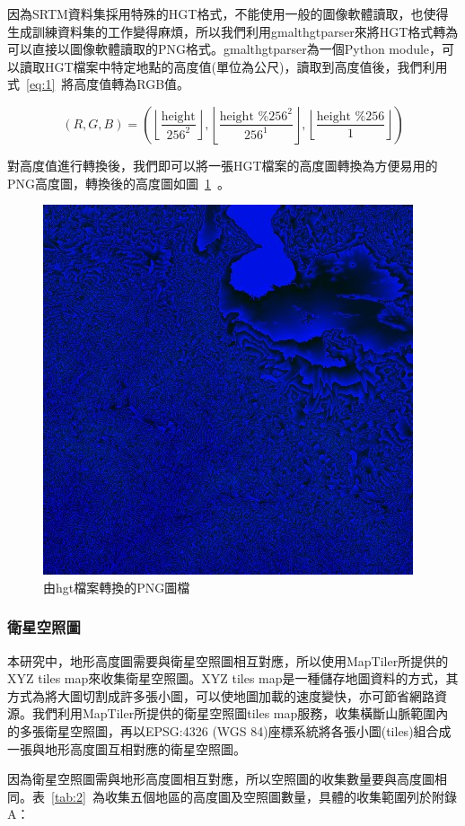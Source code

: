 \documentclass[a4paper, 12pt]{article}
\begin{document}
因為SRTM資料集採用特殊的HGT格式，不能使用一般的圖像軟體讀取，也使得生成訓練資料集的工作變得麻煩，所以我們利用gmalthgtparser來將HGT格式轉為可以直接以圖像軟體讀取的PNG格式。gmalthgtparser為一個Python module，可以讀取HGT檔案中特定地點的高度值(單位為公尺)，讀取到高度值後，我們利用式~\ref{eq:1}~將高度值轉為RGB值。

\begin{equation}
(R, G, B)=\left(\left\lfloor\frac{\text {height}}{256^{2}}\right\rfloor,\left\lfloor\frac{\text {height } \% 256^{2}}{256^{1}}\right\rfloor,\left\lfloor\frac{\text {height } \% 256}{1}\right\rfloor\right)
\label{eq:1}
\end{equation}

對高度值進行轉換後，我們即可以將一張HGT檔案的高度圖轉換為方便易用的PNG高度圖，轉換後的高度圖如圖~\ref{fig:7}~。

\begin{figure}[htbp]
    \centering
    \includegraphics[width=0.5\linewidth]{fig/7.jpg}
    \caption{由hgt檔案轉換的PNG圖檔}
    \label{fig:7}
\end{figure}

\subsubsection{衛星空照圖}
本研究中，地形高度圖需要與衛星空照圖相互對應，所以使用MapTiler所提供的XYZ tiles map來收集衛星空照圖。XYZ tiles map是一種儲存地圖資料的方式，其方式為將大圖切割成許多張小圖，可以使地圖加載的速度變快，亦可節省網路資源。我們利用MapTiler所提供的衛星空照圖tiles map服務，收集橫斷山脈範圍內的多張衛星空照圖，再以EPSG:4326 (WGS 84)座標系統將各張小圖(tiles)組合成一張與地形高度圖互相對應的衛星空照圖。

因為衛星空照圖需與地形高度圖相互對應，所以空照圖的收集數量要與高度圖相同。表~\ref{tab:2}~為收集五個地區的高度圖及空照圖數量，具體的收集範圍列於附錄A：
\end{document}
